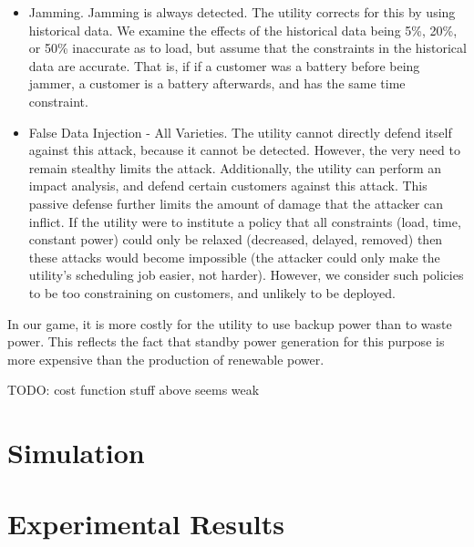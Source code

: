 \documentclass[conference]{IEEEtran}
\begin{document}
\begin{itemize}
\item Jamming.  Jamming is always detected.  The utility corrects for this by using historical data.  We examine the effects 
of the historical data being 5\%, 20\%, or 50\% inaccurate as to load, but assume that the constraints in the historical data are accurate.  That is, if if a customer was a battery before being jammer, a customer is a battery afterwards, and has the same time constraint.

\item False Data Injection - All Varieties.  The utility cannot directly defend itself against this attack, because it cannot be detected.  However, the very need to remain stealthy limits the attack.  Additionally, the utility can perform an impact analysis, and defend certain customers against this attack.  This passive defense further limits the amount of damage that the attacker can inflict.  If the utility were to institute a policy that all constraints (load, time, constant power) could only be relaxed (decreased, delayed, removed) then these attacks would become impossible (the attacker could only make the utility's scheduling job easier, not harder).  However, we consider such policies to be too constraining on customers, and unlikely to be deployed.

\end{itemize}

In our game, it is more costly for the utility to use backup power than to waste power.  This reflects the fact that standby power generation for this purpose is more expensive than the production of renewable power.

TODO: cost function stuff above seems weak

\section{Simulation}
\label{Simulation}


\section{Experimental Results}
\label{Experimental Results}
\end{document}

